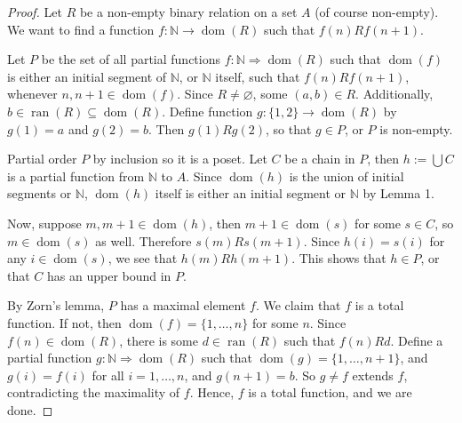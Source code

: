 \documentclass[12pt]{article}
\newcommand{\dom}[1]{\operatorname{dom}(#1)}
\newcommand{\ran}[1]{\operatorname{ran}(#1)}
\begin{document}
\begin{proof}  Let $R$ be a non-empty binary relation on a set $A$ (of course non-empty).  We want to find a function $f:\mathbb{N}\to \dom{R}$ such that $f(n) R f(n+1)$.

Let $P$ be the set of all partial functions $f:\mathbb{N}\Rightarrow \dom{R}$ such that $\dom{f}$ is either an initial segment of $\mathbb{N}$, or $\mathbb{N}$ itself, such that $f(n) R f(n+1)$, whenever $n,n+1\in \dom{f}$.  Since $R\ne \varnothing$, some $(a,b)\in R$.  Additionally, $b\in \ran{R}\subseteq \dom{R}$.  Define function $g:\lbrace 1,2\rbrace \to \dom{R}$ by $g(1)=a$ and $g(2)=b$.  Then $g(1) R g(2)$, so that $g\in P$, or $P$ is non-empty.

Partial order $P$ by inclusion so it is a poset.  Let $C$ be a chain in $P$, then $h:=\bigcup C$ is a partial function from $\mathbb{N}$ to $A$.  Since $\dom{h}$ is the union of initial segments or $\mathbb{N}$, $\dom{h}$ itself is either an initial segment or $\mathbb{N}$ by Lemma 1.

Now, suppose $m,m+1\in \dom{h}$, then $m+1\in \dom{s}$ for some $s\in C$, so $m\in \dom{s}$ as well.  Therefore $s(m) R s(m+1)$.  Since $h(i) = s(i)$ for any $i\in \dom{s}$, we see that $h(m) R h(m+1)$.  This shows that $h \in P$, or that $C$ has an upper bound in $P$.

By Zorn's lemma, $P$ has a maximal element $f$.  We claim that $f$ is a total function.  If not, then $\dom{f}=\lbrace 1,\ldots, n\rbrace$ for some $n$.  Since $f(n)\in \dom{R}$, there is some $d\in \ran{R}$ such that $f(n) R d$.  Define a partial function $g: \mathbb{N}\Rightarrow \dom{R}$ such that $\dom{g}=\lbrace 1,\ldots, n+1\rbrace$, and $g(i)=f(i)$ for all $i=1,\ldots, n$, and $g(n+1)=b$.  So $g\ne f$ extends $f$, contradicting the maximality of $f$.  Hence, $f$ is a total function, and we are done. \end{proof}
\end{document}
